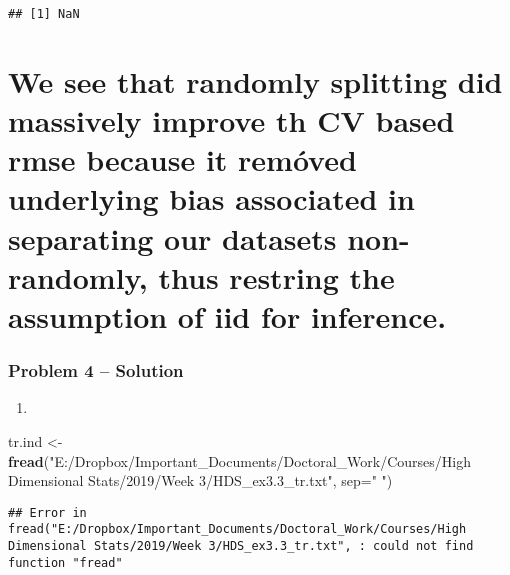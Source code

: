 \documentclass[]{article}
\newenvironment{Shaded}{\begin{snugshade}}{\end{snugshade}}
\newcommand{\CommentTok}[1]{\textcolor[rgb]{0.56,0.35,0.01}{\textit{#1}}}
\newcommand{\DataTypeTok}[1]{\textcolor[rgb]{0.13,0.29,0.53}{#1}}
\newcommand{\DecValTok}[1]{\textcolor[rgb]{0.00,0.00,0.81}{#1}}
\newcommand{\KeywordTok}[1]{\textcolor[rgb]{0.13,0.29,0.53}{\textbf{#1}}}
\newcommand{\NormalTok}[1]{#1}
\newcommand{\OperatorTok}[1]{\textcolor[rgb]{0.81,0.36,0.00}{\textbf{#1}}}
\newcommand{\StringTok}[1]{\textcolor[rgb]{0.31,0.60,0.02}{#1}}
\begin{document}
\begin{verbatim}
## [1] NaN
\end{verbatim}

\hypertarget{we-see-that-randomly-splitting-did-massively-improve-th-cv-based-rmse-because-it-remuxf3ved-underlying-bias-associated-in-separating-our-datasets-non-randomly-thus-restring-the-assumption-of-iid-for-inference.}{%
\section{We see that randomly splitting did massively improve th CV
based rmse because it remóved underlying bias associated in separating
our datasets non-randomly, thus restring the assumption of iid for
inference.}\label{we-see-that-randomly-splitting-did-massively-improve-th-cv-based-rmse-because-it-remuxf3ved-underlying-bias-associated-in-separating-our-datasets-non-randomly-thus-restring-the-assumption-of-iid-for-inference.}}

\hypertarget{problem-4-solution}{%
\subsubsection{Problem 4 -- Solution}\label{problem-4-solution}}

\begin{enumerate}
\def\labelenumi{(\alph{enumi})}
\item
\end{enumerate}

\begin{Shaded}
\begin{Highlighting}[]
\NormalTok{tr.ind <-}\StringTok{ }\KeywordTok{fread}\NormalTok{(}\StringTok{"E:/Dropbox/Important_Documents/Doctoral_Work/Courses/High Dimensional Stats/2019/Week 3/HDS_ex3.3_tr.txt"}\NormalTok{, }\DataTypeTok{sep=}\StringTok{" "}\NormalTok{)}
\end{Highlighting}
\end{Shaded}

\begin{verbatim}
## Error in fread("E:/Dropbox/Important_Documents/Doctoral_Work/Courses/High Dimensional Stats/2019/Week 3/HDS_ex3.3_tr.txt", : could not find function "fread"
\end{verbatim}

\begin{Shaded}
\end{Shaded}
\end{document}
